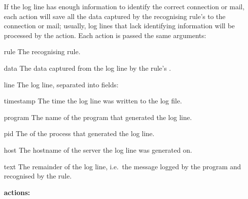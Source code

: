 If the log line has enough information to identify the correct connection
or mail, each action will save all the data captured by the recognising
rule's  to the connection or mail; usually, log lines that
lack identifying information will be processed by the
 action.  Each action is passed the same arguments:

\begin{boldeqlist}

    \squeezeitems{}

    \item [rule] The recognising rule.

    \item [data] The data captured from the log line by the rule's
        .

    \item [line] The log line, separated into fields:

        \begin{boldeqlist}

            \squeezeitems{}

            \item [timestamp] The time the log line was written to the log
                file.

            \item [program] The name of the program that generated the log
                line.

            \item [pid] The  of the process that generated the
                log line.

            \item [host] The hostname of the server the log line was
                generated on.

            \item [text] The remainder of the log line, i.e.\ the message
                logged by the program and recognised by the rule.

        \end{boldeqlist}

\end{boldeqlist}

\newpage{}

\noindent{}\textbf{\parsernames{} actions:}

